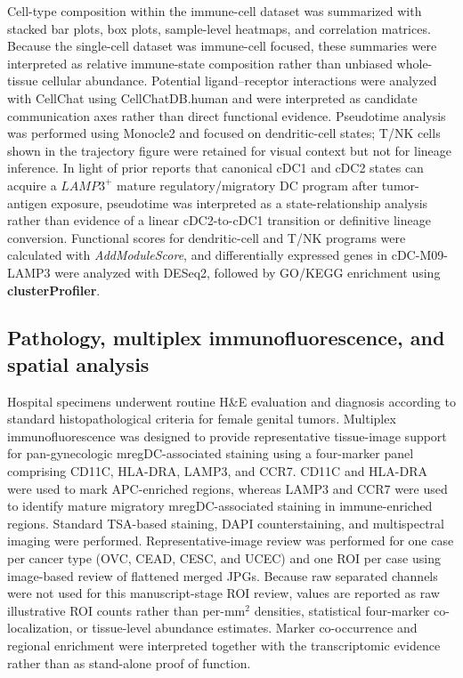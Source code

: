 \documentclass[cancers,article,submit,pdftex,moreauthors]{Definitions/mdpi}
\begin{document}
Cell-type composition within the immune-cell dataset was summarized with stacked bar plots, box plots, sample-level heatmaps, and correlation matrices\cite{bib45,bib46}. Because the single-cell dataset was immune-cell focused, these summaries were interpreted as relative immune-state composition rather than unbiased whole-tissue cellular abundance. Potential ligand--receptor interactions were analyzed with CellChat using CellChatDB.human and were interpreted as candidate communication axes rather than direct functional evidence\cite{bib47}. Pseudotime analysis was performed using Monocle2 and focused on dendritic-cell states; T/NK cells shown in the trajectory figure were retained for visual context but not for lineage inference\cite{bib48}. In light of prior reports that canonical cDC1 and cDC2 states can acquire a $LAMP3^{+}$ mature regulatory/migratory DC program after tumor-antigen exposure, pseudotime was interpreted as a state-relationship analysis rather than evidence of a linear cDC2-to-cDC1 transition or definitive lineage conversion\cite{bib17,bib18,bib20,bib21}. Functional scores for dendritic-cell and T/NK programs were calculated with \textit{AddModuleScore}, and differentially expressed genes in cDC-M09-LAMP3 were analyzed with DESeq2, followed by GO/KEGG enrichment using \textbf{clusterProfiler}\cite{bib49,bib50,bib51}.

\subsection{Pathology, multiplex immunofluorescence, and spatial analysis}
Hospital specimens underwent routine H\&E evaluation and diagnosis according to standard histopathological criteria for female genital tumors\cite{bib52}. Multiplex immunofluorescence was designed to provide representative tissue-image support for pan-gynecologic mregDC-associated staining using a four-marker panel comprising CD11C, HLA-DRA, LAMP3, and CCR7. CD11C and HLA-DRA were used to mark APC-enriched regions, whereas LAMP3 and CCR7 were used to identify mature migratory mregDC-associated staining in immune-enriched regions. Standard TSA-based staining, DAPI counterstaining, and multispectral imaging were performed. Representative-image review was performed for one case per cancer type (OVC, CEAD, CESC, and UCEC) and one ROI per case using image-based review of flattened merged JPGs. Because raw separated channels were not used for this manuscript-stage ROI review, values are reported as raw illustrative ROI counts rather than per-mm$^{2}$ densities, statistical four-marker co-localization, or tissue-level abundance estimates. Marker co-occurrence and regional enrichment were interpreted together with the transcriptomic evidence rather than as stand-alone proof of function.
\end{document}

